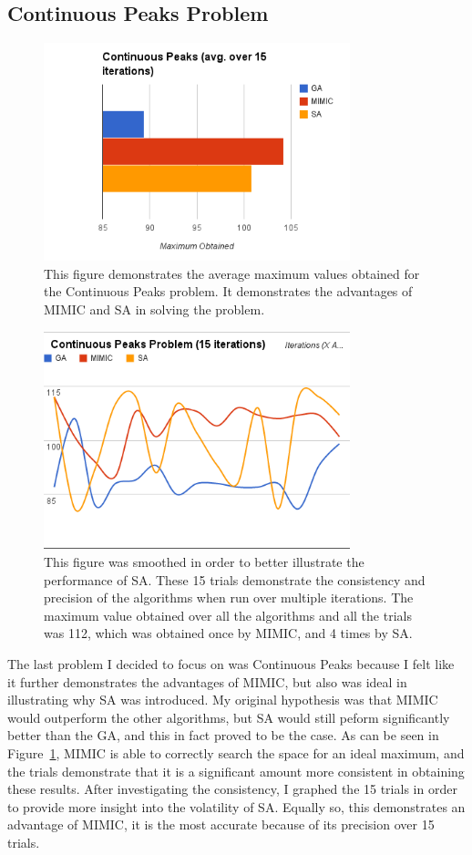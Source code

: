\documentclass[annual]{acmsiggraph}
\begin{document}
\subsection{Continuous Peaks Problem}
\begin{figure}[ht]
  \centering
  \includegraphics[width=3.5in]{charts/g9_cp.png}
  \caption{This figure demonstrates the average maximum values obtained for the Continuous Peaks problem. It demonstrates the
  advantages of MIMIC and SA in solving the problem. }
  \label{fig:g9}
\end{figure}
\begin{figure}[ht]
  \centering
  \includegraphics[width=3.5in]{charts/g10_cp.png}
  \caption{This figure was smoothed in order to better illustrate the performance of SA. These 15 trials demonstrate the 
  consistency and precision of the algorithms when run over multiple iterations. The maximum value obtained over all the
  algorithms and all the trials was 112, which was obtained once by MIMIC, and 4 times by SA.}
  \label{fig:g10}
\end{figure}
The last problem I decided to focus on was Continuous Peaks because I felt like it further demonstrates the advantages of
MIMIC, but also was ideal in illustrating why SA was introduced. My original hypothesis was that MIMIC would outperform the
other algorithms, but SA would still peform significantly better than the GA, and this in fact proved to be the case. As can
be seen in Figure~\ref{fig:g9}, MIMIC is able to correctly search the space for an ideal maximum, and the trials demonstrate
that it is a significant amount more consistent in obtaining these results. After investigating the consistency, I graphed the
15 trials in order to provide more insight into the volatility of SA. Equally so, this demonstrates an advantage of MIMIC,
it is the most accurate because of its precision over 15 trials.
\end{document}
